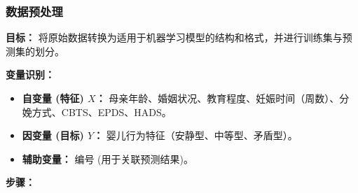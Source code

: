 \documentclass[withoutpreface,bwprint]{cumcmthesis}
\begin{document}
\subsubsection{ 数据预处理}

    \textbf{目标：} 将原始数据转换为适用于机器学习模型的结构和格式，并进行训练集与预测集的划分。
    
     \textbf{变量识别：}
    \begin{itemize}
        \item \textbf{自变量 (特征) $X$：} 母亲年龄、婚姻状况、教育程度、妊娠时间（周数）、分娩方式、CBTS、EPDS、HADS。
        \item \textbf{因变量 (目标) $Y$：} 婴儿行为特征（安静型、中等型、矛盾型）。
        \item \textbf{辅助变量：} 编号 (用于关联预测结果)。
    \end{itemize}
\textbf{步骤：}
\end{document}
